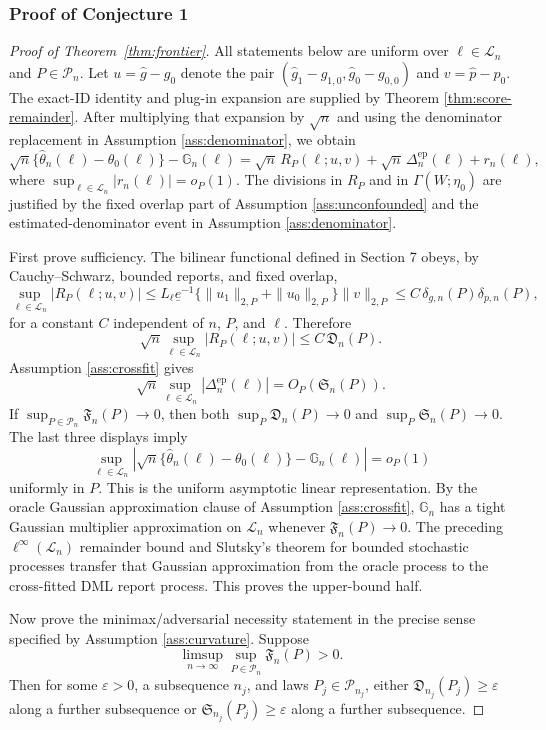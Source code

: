 \documentclass[11pt]{article}
\theoremstyle{definition}
\theoremstyle{plain}
\theoremstyle{remark}
\begin{document}
\subsubsection*{Proof of Conjecture 1}
\begin{proof}[Proof of Theorem~\ref{thm:frontier}]
All statements below are uniform over \(\ell\in\mathcal{L}_n\) and
\(P\in\mathcal{P}_n\).  Let \(u=\hat g-g_0\) denote the pair
\((\hat g_1-g_{1,0},\hat g_0-g_{0,0})\) and \(v=\hat p-p_0\).  The exact-ID
identity and plug-in expansion are supplied by Theorem
\ref{thm:score-remainder}.  After multiplying that expansion by \(\sqrt n\)
and using the denominator replacement in Assumption \ref{ass:denominator}, we
obtain
\[
\sqrt n\{\hat\theta_n(\ell)-\theta_0(\ell)\}-\mathbb{G}_n(\ell)
=\sqrt n\,R_P(\ell;u,v)
+\sqrt n\,\Delta^{\mathrm{ep}}_n(\ell)+r_n(\ell),
\]
where \(\sup_{\ell\in\mathcal{L}_n}|r_n(\ell)|=o_P(1)\).  The divisions in
\(R_P\) and in \(\Gamma(W;\eta_0)\) are justified by the fixed overlap part of
Assumption \ref{ass:unconfounded} and the estimated-denominator event in
Assumption \ref{ass:denominator}.

First prove sufficiency.  The bilinear functional defined in Section 7 obeys,
by Cauchy--Schwarz, bounded reports, and fixed overlap,
\[
\sup_{\ell\in\mathcal{L}_n}|R_P(\ell;u,v)|
\le L_\ell\underline e^{-1}
\{\|u_1\|_{2,P}+\|u_0\|_{2,P}\}\|v\|_{2,P}
\le C\,\delta_{g,n}(P)\delta_{p,n}(P),
\]
for a constant \(C\) independent of \(n\), \(P\), and \(\ell\).  Therefore
\[
\sqrt n\sup_{\ell\in\mathcal{L}_n}|R_P(\ell;u,v)|
\le C\,\mathfrak{D}_n(P).
\]
Assumption \ref{ass:crossfit} gives
\[
\sqrt n\sup_{\ell\in\mathcal{L}_n}
|\Delta^{\mathrm{ep}}_n(\ell)|=O_P(\mathfrak{S}_n(P)).
\]
If \(\sup_{P\in\mathcal{P}_n}\mathfrak{F}_n(P)\to0\), then both
\(\sup_P\mathfrak{D}_n(P)\to0\) and \(\sup_P\mathfrak{S}_n(P)\to0\).  The last
three displays imply
\[
\sup_{\ell\in\mathcal{L}_n}
\left|\sqrt n\{\hat\theta_n(\ell)-\theta_0(\ell)\}
-\mathbb{G}_n(\ell)\right|=o_P(1)
\]
uniformly in \(P\).  This is the uniform asymptotic linear representation.  By
the oracle Gaussian approximation clause of Assumption \ref{ass:crossfit},
\(\mathbb{G}_n\) has a tight Gaussian multiplier approximation on
\(\mathcal{L}_n\) whenever \(\mathfrak{F}_n(P)\to0\).  The preceding
\(\ell^\infty(\mathcal{L}_n)\) remainder bound and Slutsky's theorem for
bounded stochastic processes transfer that Gaussian approximation from the
oracle process to the cross-fitted DML report process.  This proves the
upper-bound half.

Now prove the minimax/adversarial necessity statement in the precise sense
specified by Assumption \ref{ass:curvature}.  Suppose
\[
\limsup_{n\to\infty}\sup_{P\in\mathcal{P}_n}\mathfrak{F}_n(P)>0.
\]
Then for some \(\varepsilon>0\), a subsequence \(n_j\), and laws
\(P_j\in\mathcal{P}_{n_j}\), either
\(\mathfrak{D}_{n_j}(P_j)\ge\varepsilon\) along a further subsequence or
\(\mathfrak{S}_{n_j}(P_j)\ge\varepsilon\) along a further subsequence.


\end{proof}
\end{document}
